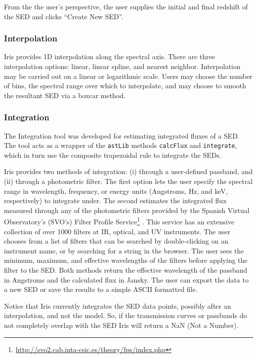 \documentclass[preprint,authoryear,5p]{elsarticle}
\begin{document}
From the the user's perspective, the user supplies the initial and final redshift of the
SED and clicks ``Create New SED''.

\subsubsection{Interpolation} Iris provides 1D interpolation along the spectral
axis. There are three interpolation options: linear, linear spline, and nearest
neighbor. Interpolation may be carried out on a linear or logarithmic scale.
Users may choose the number of bins, the spectral range over which to
interpolate, and may choose to smooth the resultant SED via a boxcar method.

\subsubsection{Integration}
The Integration tool was developed for
estimating integrated fluxes of a SED. The tool acts as a wrapper of the
\texttt{astLib} methods \texttt{calcFlux} and \texttt{integrate}, which in turn use
the composite trapezoidal rule to integrate the SEDs.

Iris provides two
methods of integration: (i) through a user-defined passband, and (ii) through a
photometric filter. The first option lets the user specify the spectral range in
wavelength, frequency, or energy units (Angstroms, Hz, and keV, respectively) to
integrate under. The second estimates the integrated flux measured through any
of the photometric filters provided by the Spanish Virtual Observatory's (SVO's)
Filter Profile
Service\footnote{\url{http://svo2.cab.inta-csic.es/theory/fps/index.php}}
\citep{2013arXiv1312.3249S}. This service has an extensive collection
of over 1000 filters at IR, optical, and UV
instruments. The user chooses from a list of filters
that can be searched by double-clicking on an instrument name, or by searching
for a string in the browser. The user sees the minimum, maximum, and effective
wavelengths of the filters before applying the filter to the SED.
Both methods return the effective wavelength of the passband in Angstroms and
the calculated flux in Jansky. The user can export the data to a new SED or
save the results to a simple ASCII formatted file.

Notice that Iris currently integrates the SED data points, possibly after an interpolation,
and not the model. So, if the transmission curves or passbands do not completely overlap with the SED
Iris will return a NaN (Not a Number).
\end{document}
